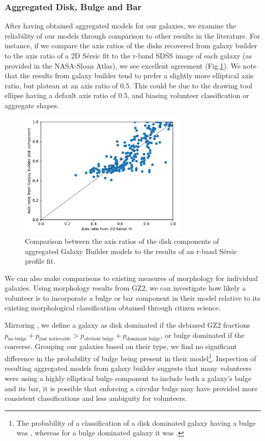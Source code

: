 \documentclass[../main.tex]{subfiles}
\begin{document}
\subsubsection{Aggregated Disk, Bulge and Bar}
After having obtained aggregated models for our galaxies, we examine the reliability of our models through comparison to other results in the literature. For instance, if we compare the axis ratios of the disks recovered from galaxy builder to the axis ratio of a 2D S\'ersic fit to the r-band SDSS image of each galaxy (as provided in the NASA-Sloan Atlas), we see excellent agreement (Fig.\ref{fig:ax_ratio_comparison}). We note that the results from galaxy builder tend to prefer a slightly more elliptical axis ratio, but plateau at an axis ratio of $0.5$. This could be due to the drawing tool ellipse having a default axis ratio of $0.5$, and biasing volunteer classification or aggregate shapes.

\begin{figure}
  \includegraphics[width=8cm]{images__results/GZBvsNSA_ax-ratio_SERSIC_BA.pdf}
  \caption{Comparison between the axis ratios of the disk components of aggregated Galaxy Builder models to the results of an r-band S\'ersic profile fit.}
  \label{fig:ax_ratio_comparison}
\end{figure}

We can also make comparisons to existing measures of morphology for individual galaxies. Using morphology results from GZ2, we can investigate how likely a volunteer is to incorporate a bulge or bar component in their model relative to its existing morphological classification obtained through citizen science.

Mirroring \citet{Kruk2017:1710.00093v2}, we define a galaxy as disk dominated if the debiased GZ2 fractions $p_\mathrm{no\; bulge} + p_\mathrm{just\; noticeable} > p_\mathrm{obvious\; bulge} + p_\mathrm{dominant\; bulge}$, or bulge dominated if the converse. Grouping our galaxies based on their type, we find no significant difference in the probability of bulge being present in their model\footnote{The probability of a classification of a disk dominated galaxy having a bulge was , whereas for a bulge dominated galaxy it was .}. Inspection of resulting aggregated models from galaxy builder suggests that many volunteers were using a highly elliptical bulge component to include both a galaxy's bulge and its bar, it is possible that enforcing a circular bulge may have provided more consistent classifications and less ambiguity for volunteers.
\end{document}
